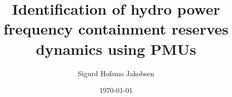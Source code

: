 \title{Identification of hydro power frequency containment reserves dynamics using PMUs}
\author{Sigurd Hofsmo Jakobsen}
\date{\today}

\begin{frame}
  \titlepage
\end{frame}
